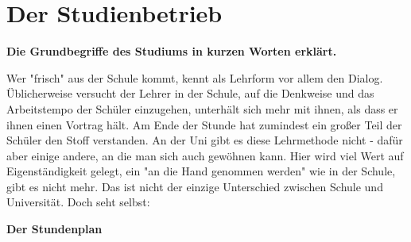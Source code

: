 \section{Der Studienbetrieb}

\textbf{Die Grundbegriffe des Studiums in kurzen Worten erklärt.}

Wer "frisch" aus der Schule kommt, kennt als Lehrform vor allem den Dialog. Üblicherweise versucht der Lehrer in der Schule, auf die Denkweise und das Arbeitstempo der Schüler einzugehen, unterhält sich mehr mit ihnen, als dass er ihnen einen Vortrag hält. Am Ende der Stunde hat zumindest ein großer Teil der Schüler den Stoff verstanden. An der Uni gibt es diese Lehrmethode nicht - dafür aber einige andere, an die man sich auch gewöhnen kann. Hier wird viel Wert auf Eigenständigkeit gelegt, ein "an die Hand genommen werden" wie in der Schule, gibt es nicht mehr. Das ist nicht der einzige Unterschied zwischen Schule und Universität. Doch seht selbst:

\textbf{Der Stundenplan}
